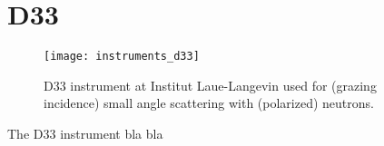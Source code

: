 \documentclass[\main/dresen_thesis.tex]{subfiles}
\begin{document}
\section{D33}\label{ch:appendix:lss:d33}
\begin{figure}[h]
  \centering
  \texttt{[image: instruments\_d33]}
  \caption{\label{fig:appendix:lss:d33}D33 instrument at Institut Laue-Langevin used for (grazing incidence) small angle scattering with (polarized) neutrons.}
\end{figure}
The D33 instrument bla bla
\end{document}
